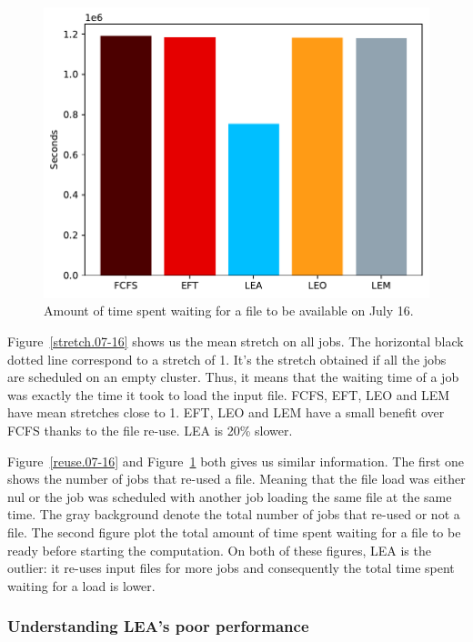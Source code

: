 \documentclass[conference,10pt]{IEEEtran}
\begin{document}
\begin{figure}[tb]\centering\includegraphics[scale=0.47]{../MBSS/plot/Results_FCFS_Score_Backfill_2022-07-16->2022-07-16_V10000_Total_waiting_for_a_load_time_and_transfer_time_450_128_32_256_4_1024.pdf}\caption{Amount of time spent waiting for a file to be available on July 16.}\label{load.07-16}\end{figure}

Figure~\ref{stretch.07-16} shows us the mean stretch on all jobs.
The horizontal black dotted line correspond to a stretch of 1.
It's the stretch obtained if all the jobs 
are scheduled on an empty cluster.
Thus, it means that the waiting time of a job was exactly
the time it took to load the input file.
FCFS, EFT, LEO and LEM have mean stretches close to 1.
EFT, LEO and LEM have a small benefit over FCFS thanks to the file re-use.
LEA is 20\% slower.

Figure~\ref{reuse.07-16} and Figure~\ref{load.07-16}
both gives us similar information. The first one 
shows the number of jobs that re-used a file.
Meaning that the file load was either nul or 
the job was scheduled with another job loading the same file
at the same time. The gray background denote the total
number of jobs that re-used or not a file.
The second figure plot the total amount of time spent 
waiting for a file to be ready before starting the computation.
On both of these figures, LEA is the outlier:
it re-uses input files for more jobs and consequently the total time spent waiting for a load is lower.

\subsubsection{Understanding LEA's poor performance}
\end{document}
